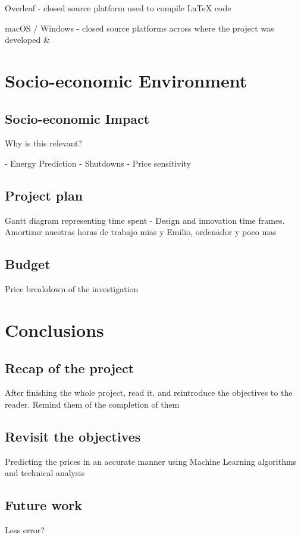 \documentclass[12pt]{report} %
\begin{document}
Overleaf - closed source platform used to compile LaTeX code \cite{overleaf}

macOS / Windows - closed source platforms across where the project was developed \cite{macos} \& \cite{windows}



\chapter{Socio-economic Environment}
\section{Socio-economic Impact}
Why is this relevant?

- Energy Prediction
- Shutdowns
- Price sensitivity

\section{Project plan}
Gantt diagram representing time spent - Design and innovation time frames. Amortizar nuestras horas de trabajo mias y Emilio, ordenador y poco mas

\section{Budget}
Price breakdown of the investigation



\chapter{Conclusions}
\section{Recap of the project}
After finishing the whole project, read it, and reintroduce the objectives to the reader. Remind them of the completion of them

\section{Revisit the objectives}
Predicting the prices in an accurate manner using Machine Learning algorithms and technical analysis

\section{Future work}
    Less error?
\end{document}
